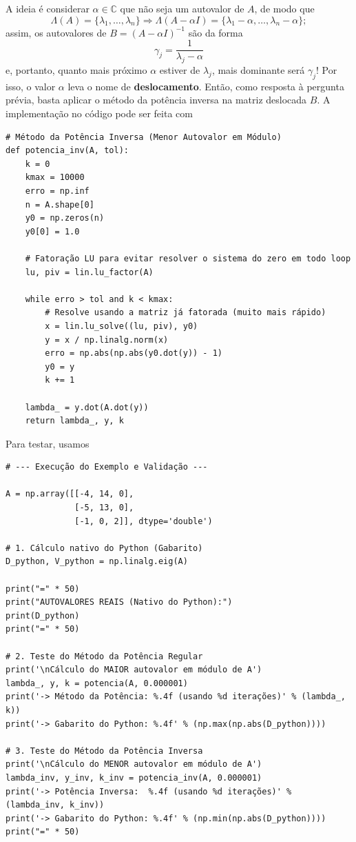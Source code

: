 \documentclass[../numerical_methods.tex]{subfiles}
\begin{document}
A ideia é considerar \(\alpha \in \mathbb{C}\) que não seja um autovalor de \(A\), de modo que
\[
	\Lambda (A) = \{\lambda_1, \dotsc , \lambda_{n}\} \Rightarrow \Lambda (A-\alpha I)=\{\lambda_{1}-\alpha , \dotsc , \lambda_{n}-\alpha \};
\]
assim, os autovalores de \(B = (A-\alpha I)^{-1}\) são da forma
\[
	\boxed{\gamma_{j}=\frac{1}{\lambda_{j}-\alpha }}
\]
e, portanto, quanto mais próximo \(\alpha \) estiver de \(\lambda_{j}\), mais dominante será \(\gamma_{j}\)! Por isso, o valor \(\alpha \) leva o nome de \textbf{deslocamento}. Então, como resposta à pergunta prévia, basta aplicar o método da potência inversa na matriz deslocada \(B\).
A implementação no código pode ser feita com
\begin{listing}[H]
	\caption{Implementação do Método da PotÊncia Inversa}
	\begin{verbatim}
# Método da Potência Inversa (Menor Autovalor em Módulo)
def potencia_inv(A, tol):
    k = 0
    kmax = 10000
    erro = np.inf
    n = A.shape[0]
    y0 = np.zeros(n)
    y0[0] = 1.0

    # Fatoração LU para evitar resolver o sistema do zero em todo loop
    lu, piv = lin.lu_factor(A)

    while erro > tol and k < kmax:
        # Resolve usando a matriz já fatorada (muito mais rápido)
        x = lin.lu_solve((lu, piv), y0)
        y = x / np.linalg.norm(x)
        erro = np.abs(np.abs(y0.dot(y)) - 1)
        y0 = y
        k += 1

    lambda_ = y.dot(A.dot(y))
    return lambda_, y, k
\end{verbatim}
\end{listing}
Para testar, usamos
\begin{listing}[H]
	\begin{verbatim}
# --- Execução do Exemplo e Validação ---

A = np.array([[-4, 14, 0],
              [-5, 13, 0],
              [-1, 0, 2]], dtype='double')

# 1. Cálculo nativo do Python (Gabarito)
D_python, V_python = np.linalg.eig(A)

print("=" * 50)
print("AUTOVALORES REAIS (Nativo do Python):")
print(D_python)
print("=" * 50)

# 2. Teste do Método da Potência Regular
print('\nCálculo do MAIOR autovalor em módulo de A')
lambda_, y, k = potencia(A, 0.000001)
print('-> Método da Potência: %.4f (usando %d iterações)' % (lambda_, k))
print('-> Gabarito do Python: %.4f' % (np.max(np.abs(D_python))))

# 3. Teste do Método da Potência Inversa
print('\nCálculo do MENOR autovalor em módulo de A')
lambda_inv, y_inv, k_inv = potencia_inv(A, 0.000001)
print('-> Potência Inversa:  %.4f (usando %d iterações)' % (lambda_inv, k_inv))
print('-> Gabarito do Python: %.4f' % (np.min(np.abs(D_python))))
print("=" * 50)
\end{verbatim}
\end{listing}
\end{document}
